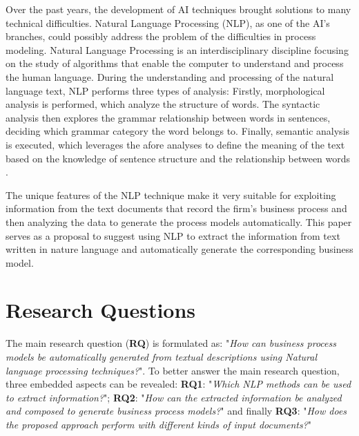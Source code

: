 	Over the past years, the development of AI techniques brought solutions to many technical difficulties. Natural Language Processing (NLP), as one of the AI's branches, could possibly address the problem of the difficulties in process modeling. Natural Language Processing is an interdisciplinary discipline focusing on the study of algorithms that enable the computer to understand and process the human language\cite{t2m_3}. During the understanding and processing of the natural language text, NLP performs three types of analysis: Firstly, morphological analysis is performed, which analyze the structure of words. The syntactic analysis then explores the grammar relationship between words in sentences, deciding which grammar category the word belongs to. Finally, semantic analysis is executed, which leverages the afore analyses to define the meaning of the text based on the knowledge of sentence structure and the relationship between words \cite{literature_review_2}. 
	
	The unique features of the NLP technique make it very suitable for exploiting information from the text documents that record the firm's business process and then analyzing the data to generate the process models automatically. This paper serves as a proposal to suggest using NLP to extract the information from text written in nature language and automatically generate the corresponding business model.

\section{Research Questions}
\label{sec:intro:rq}

%


	The main research question (\textbf{RQ}) is formulated as: "\textit{How can business process models be automatically generated from textual descriptions using Natural language processing techniques?}". To better answer the main research question, three embedded aspects can be revealed: \textbf{RQ1}: "\textit{Which NLP methods can be used to extract information?}"; \textbf{RQ2}: "\textit{How can the extracted information be analyzed and composed to generate business process models?}" and finally \textbf{RQ3}: "\textit{How does the proposed approach perform with different kinds of input documents?}"

